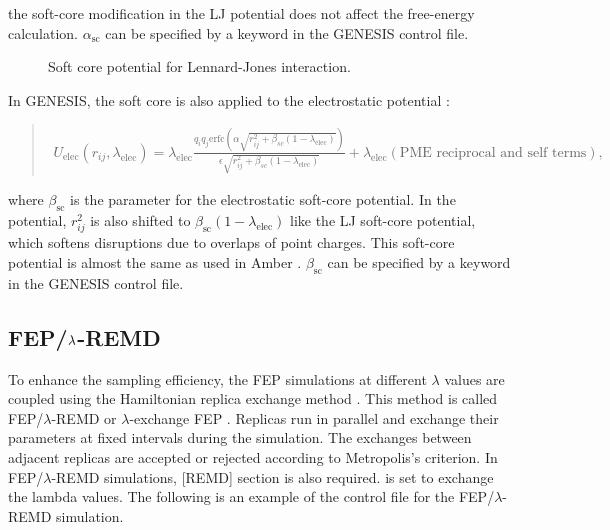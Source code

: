 \documentclass[a4paper,11pt,oneside,english]{sphinxmanual}
\begin{document}
the soft-core modification in the LJ potential does not affect the free-energy calculation.
\(\alpha_{\text{sc}}\) can be specified by a keyword  in the GENESIS control file.

\begin{figure}[htbp]
\centering
\capstart

\noindent{}
\caption{Soft core potential for Lennard-Jones interaction.}\label{\detokenize{20_Alchemy:lj-softcore}}\end{figure}

In GENESIS, the soft core is also applied to the electrostatic potential :
\begin{quote}

\vspace{-5mm}
\begin{equation*}
\begin{split}U_{\text{elec}}(r_{ij}, \lambda_{\text{elec}}) = \lambda_{\text{elec}} \frac{q_i q_j \text{erfc} (\alpha \sqrt{r_{ij}^2 + \beta_{sc} (1-\lambda_{\text{elec}})})}{\epsilon \sqrt{r_{ij}^2 + \beta_{sc} (1-\lambda_{\text{elec}})}} + \lambda_{\text{elec}} (\text{PME reciprocal and self terms}),\end{split}
\end{equation*}
\vspace{-3mm}
\end{quote}

where \(\beta_{\text{sc}}\) is the parameter for the electrostatic soft-core potential.
In the potential, \(r_{ij}^2\) is also shifted to \(\beta_{\text{sc}} (1-\lambda_{\text{elec}})\) like the LJ soft-core potential, which softens disruptions due to overlaps of point charges.
This soft-core potential is almost the same as used in Amber .
\(\beta_{\text{sc}}\) can be specified by a keyword  in the GENESIS control file.


\subsection{FEP/\protect\(\lambda\protect\)-REMD}
\label{\detokenize{20_Alchemy:fep-lambda-remd}}
To enhance the sampling efficiency, the FEP simulations at different \(\lambda\) values are coupled using the Hamiltonian replica exchange method .
This method is called FEP/\(\lambda\)-REMD or \(\lambda\)-exchange FEP .
Replicas run in parallel and exchange their parameters at fixed intervals during the simulation.
The exchanges between adjacent replicas are accepted or rejected according to Metropolis’s criterion.
In FEP/\(\lambda\)-REMD simulations, {[}REMD{]} section is also required.
 is set to exchange the lambda values.
The following is an example of the control file for the FEP/\(\lambda\)-REMD simulation.
\end{document}
